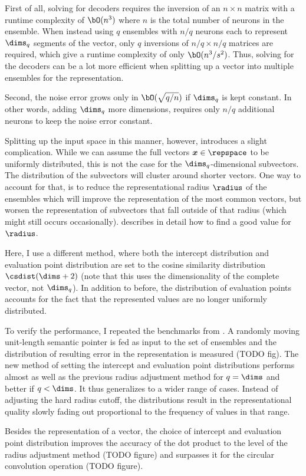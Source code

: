First of all, solving for decoders requires the inversion of an $n \times n$ matrix with a runtime complexity of $\bO(n^3)$ where $n$ is the total number of neurons in the ensemble.
When instead using $q$ ensembles with $n/q$ neurons each to represent $\dims_q$ segments of the vector, only $q$ inversions of $n/q \times n/q$ matrices are required, which give a runtime complexity of only $\bO(n^3/s^2)$.
Thus, solving for the decoders can be a lot more efficient when splitting up a vector into multiple ensembles for the representation.

Second, the noise error grows only in $\bO(\sqrt{q/n})$ if $\dims_q$ is kept constant.
In other words, adding $\dims_q$ more dimensions, requires only $n/q$ additional neurons to keep the noise error constant.

Splitting up the input space in this manner, however, introduces a slight complication.
While we can assume the full vectors $\vc x \in \repspace$ to be uniformly distributed, this is not the case for the $\dims_q$-dimensional subvectors.
The distribution of the subvectors will cluster around shorter vectors.
One way to account for that, is to reduce the representational radius $\radius$ of the ensembles which will improve the representation of the most common vectors, but worsen the representation of subvectors that fall outside of that radius (which might still occurs occasionally).
\Textcite{gosmann216} describes in detail how to find a good value for $\radius$.

Here, I use a different method, where both the intercept distribution and evaluation point distribution are set to the cosine similarity distribution $\csdist(\dims + 2)$ (note that this uses the dimensionality of the complete vector, not $\dims_q$).
In addition to before, the distribution of evaluation points accounts for the fact that the represented values are no longer uniformly distributed.

To verify the performance, I repeated the benchmarks from \textcite{gosmann216}\@.
A randomly moving unit-length semantic pointer is fed as input to the set of ensembles and the distribution of resulting error in the representation is measured (TODO fig).
The new method of setting the intercept and evaluation point distributions performs almost as well as the previous radius adjustment method for $q = \dims$ and better if $q < \dims$.
It thus generalizes to a wider range of cases.
Instead of adjusting the hard radius cutoff, the distributions result in the representational quality slowly fading out proportional to the frequency of values in that range.

Besides the representation of a vector, the choice of intercept and evaluation point distribution improves the accuracy of the dot product to the level of the radius adjustment method (TODO figure) and surpasses it for the circular convolution operation (TODO figure).
